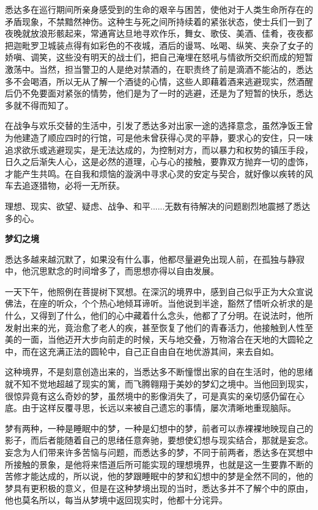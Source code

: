 \documentclass[twoside,openany]{book}
\newcommand{\mt}[1]{\textbullet \textbf{#1}}
\begin{document}
悉达多在巡行期间所亲身感受到的生命的艰辛与困苦，使他对于人类生命所存在的矛盾现象，不禁黯然神伤。这种生与死之间所持续着的紧张状态，使士兵们一到了夜晚就放浪形骸起来，常通宵达旦地寻欢作乐，舞女、歌伎、美酒、佳肴，夜夜都把迦毗罗卫城装点得有如彩色的不夜城，酒后的谩骂、吆喝、纵笑、夹杂了女子的娇嗔、调笑，这些没有明天的战士们，把自己淹埋在怒吼与情欲所交织而成的短暂激荡中。当然，担当警卫的人是绝对禁酒的，在职责终了前是滴酒不能沾的，悉达多不会喝酒，所以无从了解一个酒徒的心情，这些人即藉着酒来逃避现实，然酒醒后仍不免要面对紧张的情势，他们是为了一时的逃避，还是为了短暂的快乐，悉达多就不得而知了。

在战争与欢乐交替的生活中，引发了悉达多对出家一途的选择意念，虽然净饭王曾为他建造了顺应四时的行馆，可是他未曾获得心灵的平静，要求心的安住，只一味追求欲乐或逃避现实，是无法达成的，为控制对方，而以暴力和权势的镇压手段，日久之后渐失人心，这是必然的道理，心与心的接触，要靠双方抛弃一切的虚饰，才能产生共鸣。在自我和烦恼的漩涡中寻求心灵的安定与契合，就好像以疾转的风车去追逐猎物，必将一无所获。

理想、现实、欲望、疑虑、战争、和平......无数有待解决的问题剧烈地震撼了悉达多的心。

\mt{梦幻之境}

悉达多越来越沉默了，如果没有什么事，他都尽量避免出现人前，在孤独与静寂中，他沉思默念的时间增多了，而思想亦得以自由发展。

一天下午，他照例在菩提树下冥想。在深沉的境界中，感到自己似乎正为大众宣说佛法，在座的听众，个个热心地倾耳谛听。当他说到半途，豁然了悟听众祈求的是什么，又得到了什么，他们的心中藏着什么念头，他都了了分明。在说法时，他所发射出来的光，竟治愈了老人的疾，甚至恢复了他们的青春活力，他接触到人性至美的一面，当他迈开大步向前走的时候，天与地交叠，万物溶合在天地的大圆轮之中，而在这充满正法的圆轮中，自己正自由自在地优游其间，来去自如。

这种境界，不是刻意创造出来的，当悉达多不断憧憬出家的自在生活时，他的思绪就不知不觉地超越了现实的篱，而飞腾翱翔于美妙的梦幻之境中。当他回到现实，很惊异竟有这么奇妙的梦，虽然境中的影像消失了，可是真实的亲切感仍留在心底。由于这样反覆寻思，长远以来被自己遗忘的事情，屡次清晰地重现脑际。

梦有两种，一种是睡眠中的梦，一种是幻想中的梦，前者可以赤裸裸地映现自己的影子，而后者能随着自己的思绪任意奔驰，要想使幻想与现实结合，那就是妄念。妄念为人们带来许多苦恼与问题，而悉达多的梦，不同于前两者，悉达多在冥想中所接触的景象，是他将来悟道后所可能实现的理想境界，也就是这一生要靠不断的苦修才能达成的，所以说，他的梦跟睡眠中的梦和幻想中的梦是全然不同的，他的梦具有更积极的意义，但是在这种梦境出现的当时，悉达多并不了解个中的原由，他也莫名所以，每当从梦境中返回现实时，他都十分诧异。
\end{document}
